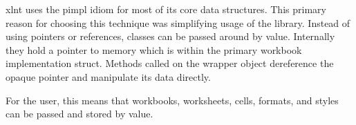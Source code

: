 
\begin{DoxyCode}{0}
\DoxyCodeLine{}
\DoxyCodeLine{\{}
\DoxyCodeLine{\}}
\DoxyCodeLine{}
\DoxyCodeLine{\{}
\DoxyCodeLine{\}}
\DoxyCodeLine{}
\DoxyCodeLine{\{}
\DoxyCodeLine{\}}

\end{DoxyCode}


xlnt uses the pimpl idiom for most of its core data structures. This primary reason for choosing this technique was simplifying usage of the library. Instead of using pointers or references, classes can be passed around by value. Internally they hold a pointer to memory which is within the primary workbook implementation struct. Methods called on the wrapper object dereference the opaque pointer and manipulate its data directly.

For the user, this means that workbooks, worksheets, cells, formats, and styles can be passed and stored by value. 
